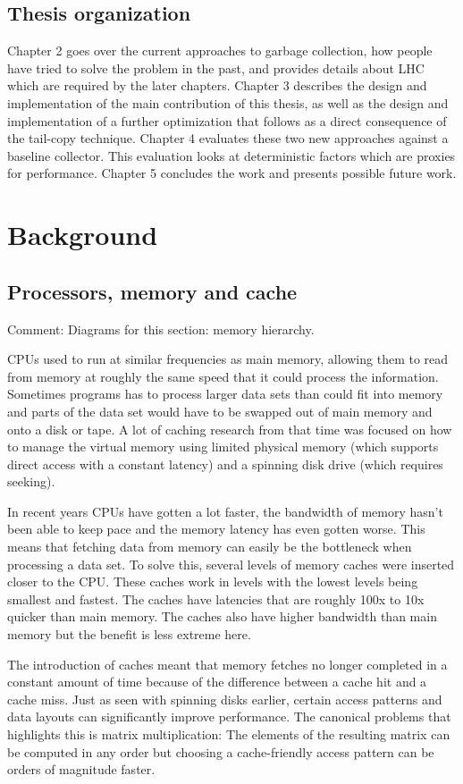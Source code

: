 \documentclass[a4paper,oneside]{memoir}
\newcommand{\makecomment}[1]{{\color{red} Comment: #1}}
\begin{document}
\section{Thesis organization}
Chapter 2 goes over the current approaches to garbage collection, how people
have tried to solve the problem in the past, and provides details about
LHC which are required by the later chapters.
Chapter 3 describes the design and implementation of the main contribution of
this thesis, as well as the design and implementation of a further optimization
that follows as a direct consequence of the tail-copy technique.
Chapter 4 evaluates these two new approaches against a baseline collector. This
evaluation looks at deterministic factors which are proxies for performance.
Chapter 5 concludes the work and presents possible future work.

\chapter{Background}
\section{Processors, memory and cache}
\makecomment{Diagrams for this section: memory hierarchy.}

CPUs used to run at similar frequencies as main memory, allowing them to read
from memory at roughly the same speed that it could process the information.
Sometimes programs has to process larger data sets than could fit into memory
and parts of the data set would have to be swapped out of main memory and onto
a disk or tape. A lot of caching research from that time was focused on how to
manage the virtual memory using limited physical memory (which supports direct
access with a constant latency) and a spinning disk drive (which requires seeking).

In recent years CPUs have gotten a lot faster, the bandwidth of memory
hasn't been able to keep pace and the memory latency has even gotten worse. This
means that fetching data from memory can easily be the bottleneck when processing
a data set. To solve this, several levels of memory caches were inserted closer
to the CPU. These caches work in levels with the lowest levels being smallest
and fastest. The caches have latencies that are roughly 100x to 10x quicker
than main memory. The caches also have higher bandwidth than main memory but
the benefit is less extreme here.

The introduction of caches meant that memory fetches no longer completed in a
constant amount of time because of the difference between a cache hit and
a cache miss. Just as seen with spinning disks earlier, certain access patterns
and data layouts can significantly improve performance. The canonical problems
that highlights this is matrix multiplication: The elements of the resulting
matrix can be computed in any order but choosing a cache-friendly access pattern
can be orders of magnitude faster.
\end{document}
